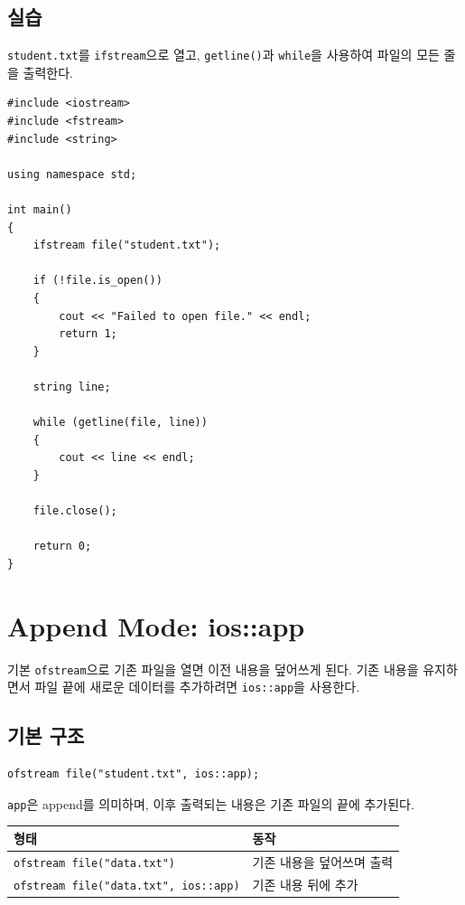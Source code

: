 \documentclass[11pt,a4paper]{article}
\begin{document}
\subsection{실습}
\begin{practicebox}
\texttt{student.txt}를 \texttt{ifstream}으로 열고,
\texttt{getline()}과 \texttt{while}을 사용하여 파일의 모든 줄을 출력한다.
\end{practicebox}

\begin{lstlisting}
#include <iostream>
#include <fstream>
#include <string>

using namespace std;

int main()
{
    ifstream file("student.txt");

    if (!file.is_open())
    {
        cout << "Failed to open file." << endl;
        return 1;
    }

    string line;

    while (getline(file, line))
    {
        cout << line << endl;
    }

    file.close();

    return 0;
}
\end{lstlisting}

\section{Append Mode: ios::app}
기본 \texttt{ofstream}으로 기존 파일을 열면 이전 내용을 덮어쓰게 된다.
기존 내용을 유지하면서 파일 끝에 새로운 데이터를 추가하려면 \texttt{ios::app}을 사용한다.

\subsection{기본 구조}
\begin{lstlisting}
ofstream file("student.txt", ios::app);
\end{lstlisting}

\texttt{app}은 append를 의미하며, 이후 출력되는 내용은 기존 파일의 끝에 추가된다.

\begin{center}
\begin{tabular}{ll}
\toprule
형태 & 동작 \\
\midrule
\texttt{ofstream file("data.txt")} & 기존 내용을 덮어쓰며 출력 \\
\texttt{ofstream file("data.txt", ios::app)} & 기존 내용 뒤에 추가 \\
\bottomrule
\end{tabular}
\end{center}
\end{document}
